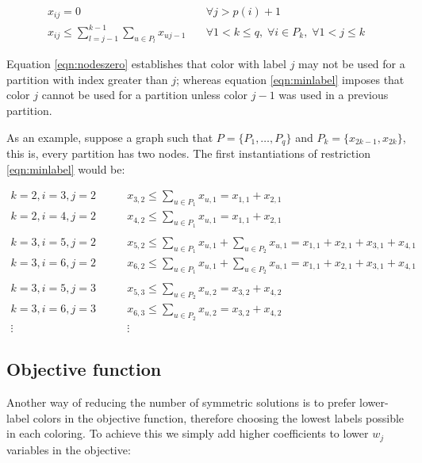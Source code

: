 \begin{align}
x_{ij} = 0 \quad &\forall j > p(i) + 1 \label{eqn:nodeszero} \\
x_{ij} \leq \sum_{l = j-1}^{k-1} \sum_{u \in P_l} x_{uj-1} \quad &\forall 1 < k \leq q, \; \forall i \in P_k, \; \forall 1 < j \leq k \label{eqn:minlabel}
\end{align}

Equation \ref{eqn:nodeszero} establishes that color with label $j$ may not be used for a partition with index greater than $j$; whereas equation \ref{eqn:minlabel} imposes that color $j$ cannot be used for a partition unless color $j-1$ was used in a previous partition.

As an example, suppose a graph such that $P = \{ P_1, \ldots, P_q \}$ and $P_k = \{ x_{2k-1}, x_{2k} \}$, this is, every partition has two nodes. The first instantiations of restriction \ref{eqn:minlabel} would be:

\begin{align*}
k = 2, i = 3, j = 2 \qquad & x_{3,2} \leq \sum_{u \in P_1} x_{u,1} = x_{1,1} + x_{2,1} \\
k = 2, i = 4, j = 2 \qquad & x_{4,2} \leq \sum_{u \in P_1} x_{u,1} = x_{1,1} + x_{2,1} \\
&\\
k = 3, i = 5, j = 2 \qquad & x_{5,2} \leq \sum_{u \in P_1} x_{u,1} + \sum_{u \in P_2} x_{u,1} = x_{1,1} + x_{2,1} + x_{3,1} + x_{4,1} \\
k = 3, i = 6, j = 2 \qquad & x_{6,2} \leq \sum_{u \in P_1} x_{u,1} + \sum_{u \in P_2} x_{u,1} = x_{1,1} + x_{2,1} + x_{3,1} + x_{4,1} \\
&\\
k = 3, i = 5, j = 3 \qquad & x_{5,3} \leq \sum_{u \in P_2} x_{u,2} = x_{3,2} + x_{4,2} \\
k = 3, i = 6, j = 3 \qquad & x_{6,3} \leq \sum_{u \in P_2} x_{u,2} = x_{3,2} + x_{4,2} \\
\vdots \qquad & \vdots
\end{align*}

\subsection{Objective function}
\label{subsec:model:obj}

Another way of reducing the number of symmetric solutions is to prefer lower-label colors in the objective function, therefore choosing the lowest labels possible in each coloring. To achieve this we simply add higher coefficients to lower $w_j$ variables in the objective:


